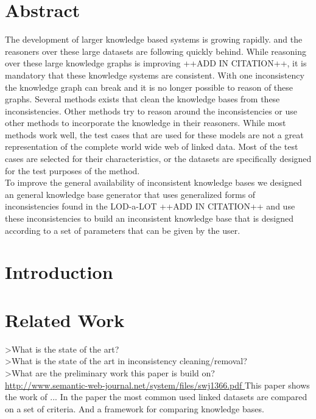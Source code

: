 \documentclass{article}
\begin{document}
\section*{Abstract}
The development of larger knowledge based systems is growing rapidly. and the reasoners over these large datasets are following quickly behind. While reasoning over these large knowledge graphs is improving ++ADD IN CITATION++, it is mandatory that these knowledge systems are consistent. With one inconsistency the knowledge graph can break and it is no longer possible to reason of these graphs. Several methods exists that clean the knowledge bases from these inconsistencies. Other methods try to reason around the inconsistencies or use other methods to incorporate the knowledge in their reasoners. While most methods work well, the test cases that are used for these models are not a great representation of the complete world wide web of linked data. Most of the test cases are selected for their characteristics, or the datasets are specifically designed for the test purposes of the method.\\
To improve the general availability of inconsistent knowledge bases we designed an general knowledge base generator that uses generalized forms of inconsistencies found in the LOD-a-LOT ++ADD IN CITATION++ and use these inconsistencies to build an inconsistent knowledge base that is designed according to a set of parameters that can be given by the user.\\


\newpage
\tableofcontents
\newpage
{}

\section{Introduction}


\newpage
\section{Related Work}
>What is the state of the art?\\

>What is the state of the art in inconsistency cleaning/removal?\\

>What are the preliminary work this paper is build on?\\


\url{http://www.semantic-web-journal.net/system/files/swj1366.pdf }
This paper shows the work of ... In the paper the most common used linked datasets are compared on a set of criteria. And a framework for comparing knowledge bases.\\
\end{document}
